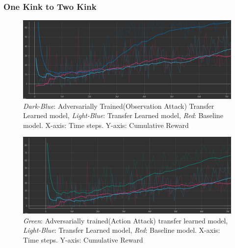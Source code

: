\subsubsection{One Kink to Two Kink}

\begin{figure}[H]
  \centering
  \includegraphics[width=1.0\textwidth]{images/graphs/AT-TL-OneKink-TwoKink.png}
  \caption{\textit{Dark-Blue}: Adversarially Trained(Observation
    Attack) Transfer Learned model, \textit{Light-Blue}: Transfer
    Learned model, \textit{Red}: Baseline model. X-axis: Time
    steps. Y-axis: Cumulative Reward }
  \label{fig:my_label}
\end{figure}


\begin{figure}[H]
  \centering
  \includegraphics[width=1.0\textwidth]{images/graphs/AAT2-TL-OneKInk-TwoKink.png}
  \caption{\textit{Green}: Adversarially trained(Action Attack)
    transfer learned model, \textit{Light-Blue}: Transfer Learned
    model, \textit{Red}: Baseline model. X-axis: Time steps. Y-axis:
    Cumulative Reward }
  \label{fig:my_label}
\end{figure}

